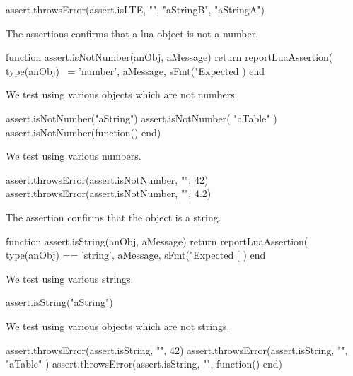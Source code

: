\startLuaTest
  assert.throwsError(assert.isLTE, "", "aStringB", "aStringA")
\stopLuaTest

\stopTestCase

\stopTestSuite


The  assertions confirms that a lua object is not 
a number. 

\startLuaCode
function assert.isNotNumber(anObj, aMessage)
  return reportLuaAssertion(
    type(anObj) ~= 'number',
    aMessage,
    sFmt("Expected %
  )
end
\stopLuaCode


We test using various objects which are not numbers. 

\startLuaTest
  assert.isNotNumber("aString")
  assert.isNotNumber({ "aTable" })
  assert.isNotNumber(function() end)
\stopLuaTest
\stopTestCase


We test using various numbers.

\startLuaTest
  assert.throwsError(assert.isNotNumber, "", 42)
  assert.throwsError(assert.isNotNumber, "", 4.2)
\stopLuaTest
\stopTestCase

\stopTestSuite


The  assertion confirms that the object is a string. 

\startLuaCode
function assert.isString(anObj, aMessage)
  return reportLuaAssertion(
    type(anObj) == 'string',
    aMessage,
    sFmt("Expected [%
  )
end
\stopLuaCode


We test using various strings.

\startLuaTest
  assert.isString("aString")
\stopLuaTest
\stopTestCase


We test using various objects which are not strings. 

\startLuaTest
  assert.throwsError(assert.isString, "", 42)
  assert.throwsError(assert.isString, "", { "aTable" })
  assert.throwsError(assert.isString, "", function() end)
\stopLuaTest
\stopTestCase

